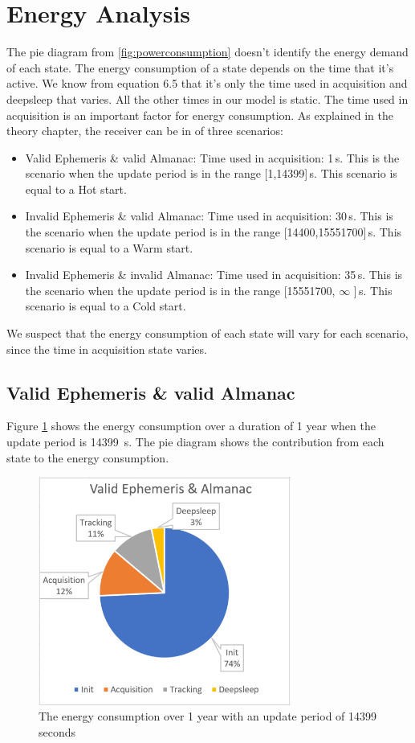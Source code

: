 \section{Energy Analysis}

The pie diagram from \ref{fig:powerconsumption} doesn't identify the energy demand of each state. The energy consumption of a state depends on the time that it's active. We know from equation 6.5 that it's only the time used in acquisition and deepsleep that varies. All the other times in our model is static. The time used in acquisition is an important factor for energy consumption. As explained in the theory chapter, the receiver can be in of three scenarios: 

\begin{itemize}
    \item Valid Ephemeris \& valid Almanac: Time used in acquisition: 1\,s. This is the scenario when the update period is in the range [1,14399]\,s. This scenario is equal to a Hot start.
    \item Invalid Ephemeris \& valid Almanac: Time used in acquisition: 30\,s. This is the scenario when the update period is in the range [14400,15551700]\,s. This scenario is equal to a Warm start.
    \item Invalid Ephemeris \& invalid Almanac: Time used in acquisition: 35\,s. This is the scenario when the update period is in the range [15551700, $\infty$ ]\,s. This scenario is equal to a Cold start.
\end{itemize}

We suspect that the energy consumption of each state will vary for each scenario, since the time in acquisition state varies. 

\subsection{Valid Ephemeris \& valid Almanac}

Figure \ref{fig:firstcase} shows the energy consumption over a duration of 1 year when the update period is 14399 \,s. The pie diagram shows the contribution from each state to the energy consumption. 

\begin{figure}[H]
\centering
\includegraphics[height=7.5cm]{Project_Report/Images/Allvalid.PNG}
\caption{The energy consumption over 1 year with an update period of 14399 seconds}
\label{fig:firstcase}
\end{figure}

